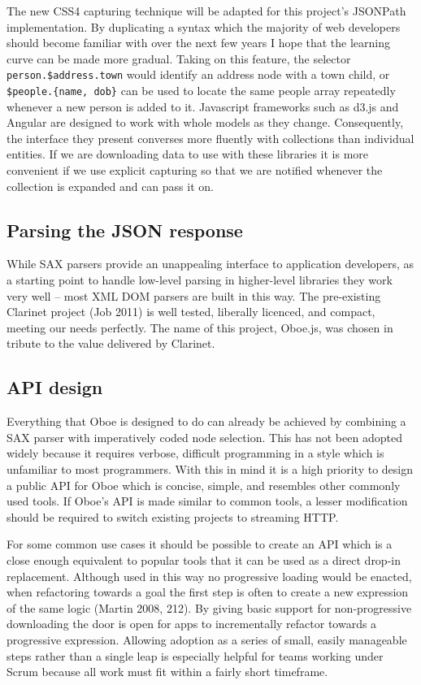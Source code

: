 \documentclass[12pt, ]{article}
\begin{document}
The new CSS4 capturing technique will be adapted for this project's
JSONPath implementation. By duplicating a syntax which the majority of
web developers should become familiar with over the next few years I
hope that the learning curve can be made more gradual. Taking on this
feature, the selector \texttt{person.\$address.town} would identify an
address node with a town child, or \texttt{\$people.\{name, dob\}} can
be used to locate the same people array repeatedly whenever a new person
is added to it. Javascript frameworks such as d3.js and Angular are
designed to work with whole models as they change. Consequently, the
interface they present converses more fluently with collections than
individual entities. If we are downloading data to use with these
libraries it is more convenient if we use explicit capturing so that we
are notified whenever the collection is expanded and can pass it on.

\subsection{Parsing the JSON response}\label{parsing-the-json-response}

While SAX parsers provide an unappealing interface to application
developers, as a starting point to handle low-level parsing in
higher-level libraries they work very well -- most XML DOM parsers are
built in this way. The pre-existing Clarinet project (Job 2011) is well
tested, liberally licenced, and compact, meeting our needs perfectly.
The name of this project, Oboe.js, was chosen in tribute to the value
delivered by Clarinet.

\subsection{API design}\label{api-design}

Everything that Oboe is designed to do can already be achieved by
combining a SAX parser with imperatively coded node selection. This has
not been adopted widely because it requires verbose, difficult
programming in a style which is unfamiliar to most programmers. With
this in mind it is a high priority to design a public API for Oboe which
is concise, simple, and resembles other commonly used tools. If Oboe's
API is made similar to common tools, a lesser modification should be
required to switch existing projects to streaming HTTP.

For some common use cases it should be possible to create an API which
is a close enough equivalent to popular tools that it can be used as a
direct drop-in replacement. Although used in this way no progressive
loading would be enacted, when refactoring towards a goal the first step
is often to create a new expression of the same logic (Martin 2008,
212). By giving basic support for non-progressive downloading the door
is open for apps to incrementally refactor towards a progressive
expression. Allowing adoption as a series of small, easily manageable
steps rather than a single leap is especially helpful for teams working
under Scrum because all work must fit within a fairly short timeframe.
\end{document}
